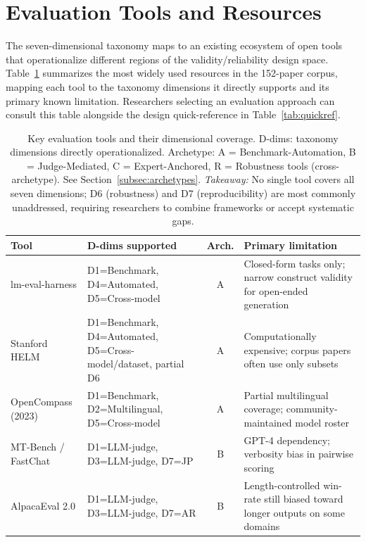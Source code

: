 \documentclass[acmsmall, nonacm, screen]{acmart}
\begin{document}
\section{Evaluation Tools and Resources}
\label{sec:tools}

The seven-dimensional taxonomy maps to an existing ecosystem of open
tools that operationalize different regions of the
validity/reliability design space. Table~\ref{tab:tools} summarizes
the most widely used resources in the 152-paper corpus, mapping each
tool to the taxonomy dimensions it directly supports and its primary
known limitation. Researchers selecting an evaluation approach can
consult this table alongside the design quick-reference in
Table~\ref{tab:quickref}.

\begin{table}[!htbp]
\renewcommand{\arraystretch}{1.15}
\caption{Key evaluation tools and their dimensional coverage.
D-dims: taxonomy dimensions directly operationalized. Archetype: A =
Benchmark-Automation, B = Judge-Mediated, C = Expert-Anchored, R =
Robustness tools (cross-archetype). See Section~\ref{subsec:archetypes}.
\textit{Takeaway:} No single tool covers all seven dimensions; D6 (robustness) and D7 (reproducibility) are most commonly unaddressed, requiring researchers to combine frameworks or accept systematic gaps.}
\label{tab:tools}
\centering
\footnotesize
\begin{tabular}{p{2.8cm} p{3.8cm} c p{4.6cm}}
\toprule
\textbf{Tool} & \textbf{D-dims supported} & \textbf{Arch.} & \textbf{Primary limitation} \\
\midrule
lm-eval-harness \cite{gao2021lmeval}
  & D1=Benchmark, D4=Automated, D5=Cross-model
  & A
  & Closed-form tasks only; narrow construct validity for open-ended generation \\
Stanford HELM \cite{liang2022helm}
  & D1=Benchmark, D4=Automated, D5=Cross-model/dataset, partial D6
  & A
  & Computationally expensive; corpus papers often use only subsets \\
OpenCompass (2023)
  & D1=Benchmark, D2=Multilingual, D5=Cross-model
  & A
  & Partial multilingual coverage; community-maintained model roster \\
MT-Bench / FastChat \cite{zheng2023judging}
  & D1=LLM-judge, D3=LLM-judge, D7=JP
  & B
  & GPT-4 dependency; verbosity bias in pairwise scoring \\
AlpacaEval 2.0 \cite{dubois2024alpacaeval}
  & D1=LLM-judge, D3=LLM-judge, D7=AR
  & B
  & Length-controlled win-rate still biased toward longer outputs on some domains \\

\end{tabular}
\end{table}
\end{document}
